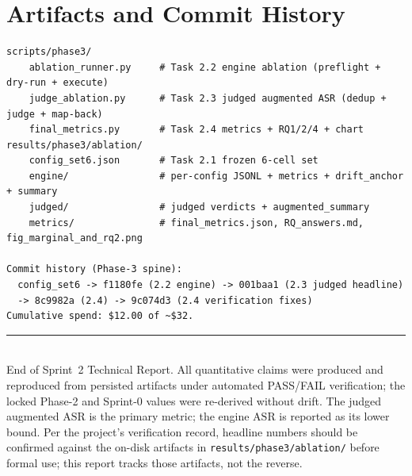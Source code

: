 \documentclass[11pt,a4paper]{article}
\newcommand{\code}[1]{\texttt{\small #1}}
\newcommand{\asr}{\textrm{ASR}}
\begin{document}
\section{Artifacts and Commit History}
\begin{lstlisting}
scripts/phase3/
    ablation_runner.py     # Task 2.2 engine ablation (preflight + dry-run + execute)
    judge_ablation.py      # Task 2.3 judged augmented ASR (dedup + judge + map-back)
    final_metrics.py       # Task 2.4 metrics + RQ1/2/4 + chart
results/phase3/ablation/
    config_set6.json       # Task 2.1 frozen 6-cell set
    engine/                # per-config JSONL + metrics + drift_anchor + summary
    judged/                # judged verdicts + augmented_summary
    metrics/               # final_metrics.json, RQ_answers.md, fig_marginal_and_rq2.png

Commit history (Phase-3 spine):
  config_set6 -> f1180fe (2.2 engine) -> 001baa1 (2.3 judged headline)
  -> 8c9982a (2.4) -> 9c074d3 (2.4 verification fixes)
Cumulative spend: $12.00 of ~$32.
\end{lstlisting}

\vfill
\noindent\rule{\textwidth}{0.4pt}\\
{\footnotesize End of Sprint~2 Technical Report. All quantitative claims were produced and reproduced from persisted artifacts under automated PASS/FAIL verification; the locked Phase-2 and Sprint-0 values were re-derived without drift. The judged augmented $\asr$ is the primary metric; the engine $\asr$ is reported as its lower bound. Per the project's verification record, headline numbers should be confirmed against the on-disk artifacts in \code{results/phase3/ablation/} before formal use; this report tracks those artifacts, not the reverse.}
\end{document}
